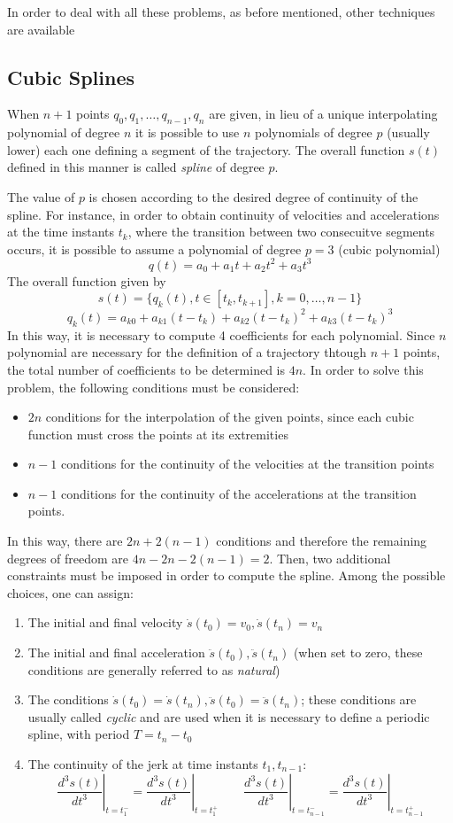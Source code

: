 \documentclass{book}
\newcommand\at[2]{\left.#1\right|_{#2}}
\begin{document}
In order to deal with all these problems, as before mentioned, other techniques are available 

\subsection{Cubic Splines}
When $n+1$ points $q_0,q_1,\dots,q_{n-1},q_n$ are given, in lieu of a unique interpolating polynomial of degree $n$ it is possible to use $n$ polynomials of degree $p$ (usually lower) each one defining a segment of the trajectory. The overall function $s(t)$ defined in this manner is called \emph{spline} of degree $p$.

The value of $p$ is chosen according to the desired degree of continuity of the spline. For instance, in order to obtain continuity of velocities and accelerations at the time instants $t_k$, where the transition between two consecuitve segments occurs, it is possible to assume a polynomial of degree $p=3$ (cubic polynomial) 
\[
  q(t)=a_0 + a_1t+a_2t^2+a_3t^3
\]
The overall function given by 
\[
  s(t) = \{q_k(t), t\in[t_k,t_{k+1}],k=0,\dots,n-1\}
\]
\[
  q_k(t)=a_{k0}+a_{k1}(t-t_k)+a_{k2}(t-t_k)^2+a_{k3}(t-t_k)^3
\]
In this way, it is necessary to compute 4 coefficients for each polynomial. Since $n$ polynomial are necessary for the definition of a trajectory thtough $n+1$ points, the total number of coefficients to be determined is $4n$.
In order to solve this problem, the following conditions must be considered: 
\begin{itemize}
  \item $2n$ conditions for the interpolation of the given points, since each cubic function must cross the points at its extremities 
    \item $n-1$ conditions for the continuity of the velocities at the transition points 
      \item $n-1$ conditions for the continuity of the accelerations at the transition points.
\end{itemize}
In this way, there are $2n+2(n-1)$ conditions and therefore the remaining degrees of freedom are $4n-2n-2(n-1)=2$. Then, two additional constraints must be imposed in order to compute the spline. Among the possible choices, one can assign: 
\begin{enumerate}
  \item The initial and final velocity $\dot{s}(t_0)=v_0, \dot{s}(t_n)=v_n$ 
  \item The initial and final acceleration $\ddot{s}(t_0),\ddot{s}(t_n)$ (when set to zero, these conditions are generally referred to as \emph{natural})
  \item The conditions $\dot{s}(t_0)=\dot{s}(t_n),\ddot{s}(t_0)=\ddot{s}(t_n)$; these conditions are usually called \emph{cyclic} and are used when it is necessary to define a periodic spline, with period $T=t_n-t_0$
  \item The continuity of the jerk at time instants $t_1, t_{n-1}$: 
    \[
      \at{\displaystyle\frac{d^3s(t)}{dt^3}}{t=t_1^-}=\at{\displaystyle\frac{d^3s(t)}{dt^3}}{t=t_1^+} \qquad \at{\displaystyle\frac{d^3s(t)}{dt^3}}{t=t_{n-1}^-}=\at{\displaystyle\frac{d^3s(t)}{dt^3}}{t=t_{n-1}^+} 
    \]
\end{enumerate}
\end{document}
